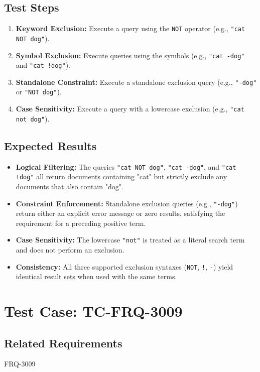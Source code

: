 \documentclass{article}
\begin{document}
\subsection*{Test Steps}
\begin{enumerate}
  \item \textbf{Keyword Exclusion:} Execute a query using the \texttt{NOT} operator (e.g., \texttt{"cat NOT dog"}).
  \item \textbf{Symbol Exclusion:} Execute queries using the symbols (e.g., \texttt{"cat -dog"} and \texttt{"cat !dog"}).
  \item \textbf{Standalone Constraint:} Execute a standalone exclusion query (e.g., \texttt{"-dog"} or \texttt{"NOT dog"}).
  \item \textbf{Case Sensitivity:} Execute a query with a lowercase exclusion (e.g., \texttt{"cat not dog"}).
\end{enumerate}

\subsection*{Expected Results}
\begin{itemize}
  \item \textbf{Logical Filtering:} The queries \texttt{"cat NOT dog"}, \texttt{"cat -dog"}, and \texttt{"cat !dog"} all return documents containing "cat" but strictly exclude any documents that also contain "dog".
  \item \textbf{Constraint Enforcement:} Standalone exclusion queries (e.g., \texttt{"-dog"}) return either an explicit error message or zero results, satisfying the requirement for a preceding positive term.
  \item \textbf{Case Sensitivity:} The lowercase \texttt{"not"} is treated as a literal search term and does not perform an exclusion.
  \item \textbf{Consistency:} All three supported exclusion syntaxes (\texttt{NOT}, \texttt{!}, \texttt{-}) yield identical result sets when used with the same terms.
\end{itemize}


\section{Test Case: TC-FRQ-3009}

\subsection*{Related Requirements}
FRQ-3009
\end{document}
